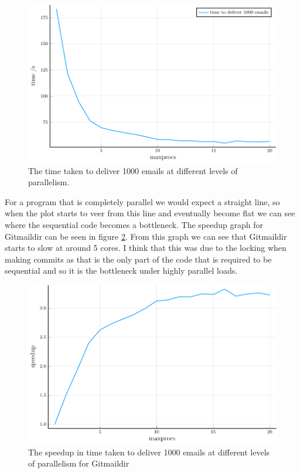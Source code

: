 \begin{figure}[h]
    \centering
    \includegraphics{figs/tdpp}
    \caption{The time taken to deliver 1000 emails at different levels of parallelism.}
    \label{fig:tdpp}
\end{figure}

For a program that is completely parallel we would expect a straight line, so when the plot starts to veer from this line and eventually become flat we can see where the sequential code becomes a bottleneck. The speedup graph for Gitmaildir can be seen in figure \ref{fig:tdpp_speedup}. From this graph we can see that Gitmaildir starts to slow at around 5 cores. I think that this was due to the locking when making commits as that is the only part of the code that is required to be sequential and so it is the bottleneck under highly parallel loads.

\begin{figure}[h]
    \centering
    \includegraphics{figs/tdpp_speedup}
    \caption{The speedup in time taken to deliver 1000 emails at different levels of parallelism for Gitmaildir}
    \label{fig:tdpp_speedup}
\end{figure}

